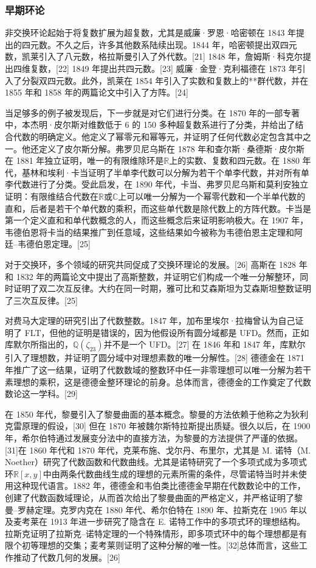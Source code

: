 \subsubsection{早期环论}
非交换环论起始于将复数扩展为超复数，尤其是威廉·罗恩·哈密顿在 1843 年提出的四元数。不久之后，许多其他数系陆续出现。1844 年，哈密顿提出双四元数，凯莱引入了八元数，格拉斯曼引入了外代数。[21] 1848 年，詹姆斯·科克尔提出四维复数，[22] 1849 年提出共四元数。[23] 威廉·金登·克利福德在 1873 年引入了分裂双四元数。此外，凯莱在 1854 年引入了实数和复数上的**群代数，并在 1855 年和 1858 年的两篇论文中引入了方阵。[24]

当足够多的例子被发现后，下一步就是对它们进行分类。在 1870 年的一部专著中，本杰明·皮尔斯对维数低于 6 的 150 多种超复数系进行了分类，并给出了结合代数的明确定义。他定义了幂零元和幂等元，并证明了任何代数必定包含其中之一。他还定义了皮尔斯分解。弗罗贝尼乌斯在 1878 年和查尔斯·桑德斯·皮尔斯在 1881 年独立证明，唯一的有限维除环是$\mathbb{R}$上的实数、复数和四元数。在 1880 年代，基林和埃利·卡当证明了半单李代数可以分解为若干个单李代数，并对所有单李代数进行了分类。受此启发，在 1890 年代，卡当、弗罗贝尼乌斯和莫利安独立证明：有限维结合代数在$\mathbb{R}$或$\mathbb{C}$上可以唯一分解为一个幂零代数和一个半单代数的直和，后者是若干个单代数的乘积，而这些单代数是除代数上的方阵代数。卡当是第一个定义直和和单代数概念的人，而这些概念后来证明影响极大。在 1907 年，韦德伯恩将卡当的结果推广到任意域，这些结果如今被称为韦德伯恩主定理和阿廷–韦德伯恩定理。[25]

对于交换环，多个领域的研究共同促成了交换环理论的发展。[26] 高斯在 1828 年和 1832 年的两篇论文中提出了高斯整数，并证明它们构成一个唯一分解整环，同时证明了双二次互反律。大约在同一时期，雅可比和艾森斯坦为艾森斯坦整数证明了三次互反律。[25]

对费马大定理的研究引出了代数整数。1847 年，加布里埃尔·拉梅曾认为自己证明了 FLT，但他的证明是错误的，因为他假设所有圆分域都是 UFD。然而，正如库默尔所指出的，$\mathbb{Q}(\zeta_{23})$并不是一个 UFD。[27] 在 1846 年和 1847 年，库默尔引入了理想数，并证明了圆分域中对理想素数的唯一分解性。[28] 德德金在 1871 年推广了这一结果，证明了代数数域的整数环中任一非零理想可以唯一分解为若干素理想的乘积，这是德德金整环理论的前身。总体而言，德德金的工作奠定了代数数论这一学科。[29]

在 1850 年代，黎曼引入了黎曼曲面的基本概念。黎曼的方法依赖于他称之为狄利克雷原理的假设，[30] 但在 1870 年被魏尔斯特拉斯提出质疑。很久以后，在 1900 年，希尔伯特通过发展变分法中的直接方法，为黎曼的方法提供了严谨的依据。[31]在 1860 年代和 1870 年代，克莱布施、戈尔丹、布里尔，尤其是 M. 诺特（M. Noether）研究了代数函数和代数曲线。尤其是诺特研究了一个多项式成为多项式环$\mathbb{R}[x,y]$中由两条代数曲线生成的理想的元素所需的条件，尽管诺特当时并未使用这种现代语言。1882 年，德德金和韦伯类比德德金早期在代数数论中的工作，创建了代数函数域理论，从而首次给出了黎曼曲面的严格定义，并严格证明了黎曼–罗赫定理。克罗内克在 1880 年代、希尔伯特在 1890 年、拉斯克在 1905 年以及麦考莱在 1913 年进一步研究了隐含在 E. 诺特工作中的多项式环的理想结构。拉斯克证明了拉斯克–诺特定理的一个特殊情形，即多项式环中的每个理想都是有限个初等理想的交集；麦考莱则证明了这种分解的唯一性。[32]总体而言，这些工作推动了代数几何的发展。[26]

